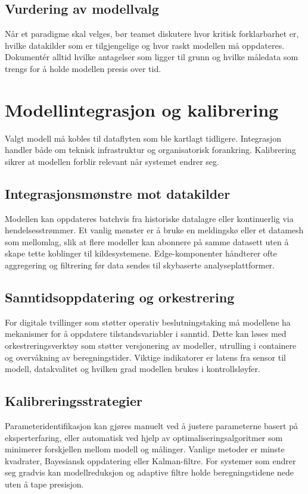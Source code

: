 \subsection{Vurdering av modellvalg}
Når et paradigme skal velges, bør teamet diskutere hvor kritisk forklarbarhet er, hvilke datakilder som er tilgjengelige og hvor
raskt modellen må oppdateres. Dokumentér alltid hvilke antagelser som ligger til grunn og hvilke måledata som trengs for å holde
modellen presis over tid.

\section{Modellintegrasjon og kalibrering}
Valgt modell må kobles til dataflyten som ble kartlagt tidligere. Integrasjon handler både om teknisk infrastruktur og
organisatorisk forankring. Kalibrering sikrer at modellen forblir relevant når systemet endrer seg.

\subsection{Integrasjonsmønstre mot datakilder}
Modellen kan oppdateres batchvis fra historiske datalagre eller kontinuerlig via hendelsesstrømmer. Et vanlig mønster er å bruke
en meldingskø eller et datamesh som mellomlag, slik at flere modeller kan abonnere på samme datasett uten å skape tette koblinger
til kildesystemene. Edge-komponenter håndterer ofte aggregering og filtrering før data sendes til skybaserte analyseplattformer.

\subsection{Sanntidsoppdatering og orkestrering}
For digitale tvillinger som støtter operativ beslutningstaking må modellene ha mekanismer for å oppdatere tilstandsvariabler i
sanntid. Dette kan løses med orkestreringsverktøy som støtter versjonering av modeller, utrulling i containere og overvåkning av
beregningstider. Viktige indikatorer er latens fra sensor til modell, datakvalitet og hvilken grad modellen brukes i kontrollsløyfer.

\subsection{Kalibreringsstrategier}
Parameteridentifikasjon kan gjøres manuelt ved å justere parameterne basert på eksperterfaring, eller automatisk ved hjelp av
optimaliseringsalgoritmer som minimerer forskjellen mellom modell og målinger. Vanlige metoder er minste kvadrater,
Bayesiansk oppdatering eller Kalman-filtre. For systemer som endrer seg gradvis kan modellreduksjon og adaptive filtre holde
beregningstidene nede uten å tape presisjon.

